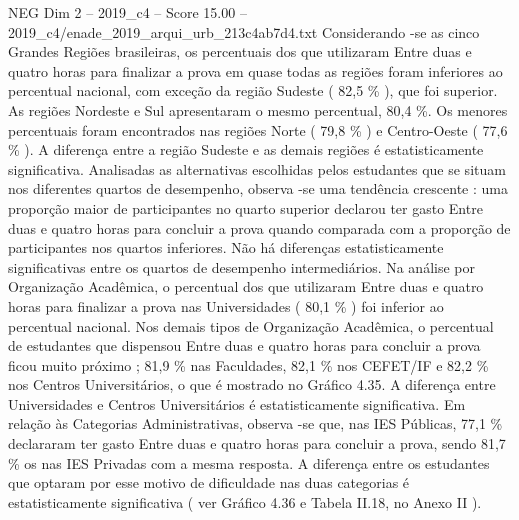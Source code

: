 \begin{textsample}{NEG Dim 2 – 2019\_c4 – Score 15.00 – 2019\_c4/enade\_2019\_arqui\_urb\_213c4ab7d4.txt}
Considerando -se as cinco Grandes Regiões brasileiras, os percentuais dos que utilizaram Entre duas e quatro horas para finalizar a prova em quase todas as regiões foram inferiores ao percentual nacional, com exceção da região Sudeste ( 82,5 \% ), que foi superior.
As regiões Nordeste e Sul apresentaram o mesmo percentual, 80,4 \%.
Os menores percentuais foram encontrados nas regiões Norte ( 79,8 \% ) e Centro-Oeste ( 77,6 \% ).
A diferença entre a região Sudeste e as demais regiões é estatisticamente significativa.
Analisadas as alternativas escolhidas pelos estudantes que se situam nos diferentes quartos de desempenho, observa -se uma tendência crescente : uma proporção maior de participantes no quarto superior declarou ter gasto Entre duas e quatro horas para concluir a prova quando comparada com a proporção de participantes nos quartos inferiores.
Não há diferenças estatisticamente significativas entre os quartos de desempenho intermediários.
Na análise por Organização Acadêmica, o percentual dos que utilizaram Entre duas e quatro horas para finalizar a prova nas Universidades ( 80,1 \% ) foi inferior ao percentual nacional.
Nos demais tipos de Organização Acadêmica, o percentual de estudantes que dispensou Entre duas e quatro horas para concluir a prova ficou muito próximo ; 81,9 \% nas Faculdades, 82,1 \% nos CEFET/IF e 82,2 \% nos Centros Universitários, o que é mostrado no Gráfico 4.35.
A diferença entre Universidades e Centros Universitários é estatisticamente significativa.
Em relação às Categorias Administrativas, observa -se que, nas IES Públicas, 77,1 \% declararam ter gasto Entre duas e quatro horas para concluir a prova, sendo 81,7 \% os nas IES Privadas com a mesma resposta.
A diferença entre os estudantes que optaram por esse motivo de dificuldade nas duas categorias é estatisticamente significativa ( ver Gráfico 4.36 e Tabela II.18, no Anexo II ).

\end{textsample}
